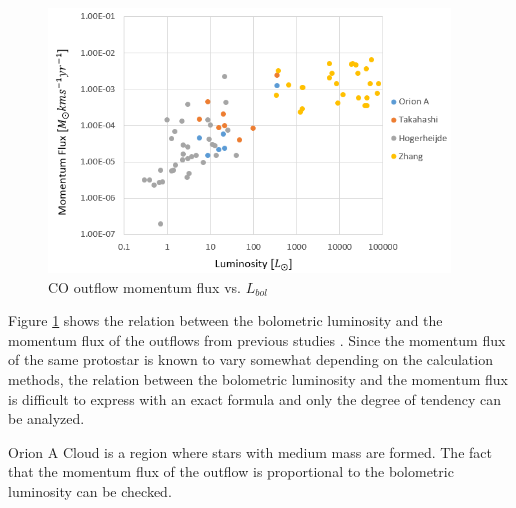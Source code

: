 \begin{figure}[b!]
	\centering
	\includegraphics[width=0.95\textwidth]{Luminosity}
	\caption{CO outflow momentum flux vs. $L_{bol}$}
	\label{fig:lum}
\end{figure}

Figure \ref{fig:lum} shows the relation between the bolometric luminosity and the momentum flux of the outflows from previous studies \cite{takahashi2008millimeter, van2013outflow, hogerheijde1998envelope, nakamura2012evidence, aso2000dense, zhang2005search}.
Since the momentum flux of the same protostar is known to vary somewhat depending on the calculation methods\cite{van2013outflow}, the relation between the bolometric luminosity and the momentum flux is difficult to express with an exact formula and only the degree of tendency can be analyzed.

Orion A Cloud is a region where stars with medium mass are formed. The fact that the momentum flux of the outflow is proportional to the bolometric luminosity can be checked.	




